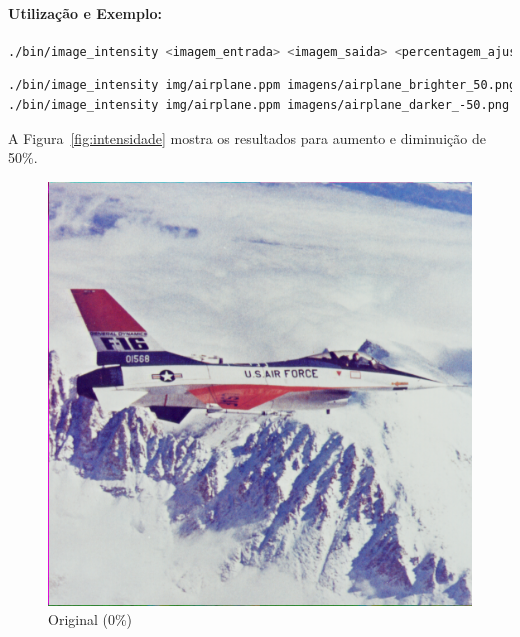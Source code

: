 \documentclass[a4paper, 11pt, portuguese]{article}
\begin{document}
\paragraph{Utilização e Exemplo:}
\begin{lstlisting}[language=bash, caption=Sintaxe de Uso do image\_intensity]
./bin/image_intensity <imagem_entrada> <imagem_saida> <percentagem_ajuste>
\end{lstlisting}
\begin{lstlisting}[language=bash]
./bin/image_intensity img/airplane.ppm imagens/airplane_brighter_50.png 50
./bin/image_intensity img/airplane.ppm imagens/airplane_darker_-50.png -50
\end{lstlisting}
A Figura~\ref{fig:intensidade} mostra os resultados para aumento e diminuição de 50\%.

\begin{figure}[htbp]
\centering
\begin{minipage}{0.32\textwidth}
    \centering
    \includegraphics[width=\textwidth]{imagens/airplane.png}
    \caption*{Original (0\%)}
\end{minipage}
\hfill
\begin{minipage}{0.32\textwidth}
    \centering

\end{minipage}
\end{figure}
\end{document}
